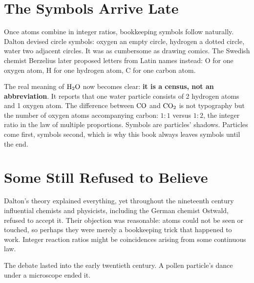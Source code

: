 \section{The Symbols Arrive Late}

Once atoms combine in integer ratios, bookkeeping symbols follow naturally. Dalton devised circle symbols: oxygen an empty circle, hydrogen a dotted circle, water two adjacent circles. It was as cumbersome as drawing comics. The Swedish chemist Berzelius later proposed letters from Latin names instead: O for one oxygen atom, H for one hydrogen atom, C for one carbon atom.

The real meaning of $\mathrm{H_2O}$ now becomes clear: \textbf{it is a census, not an abbreviation}. It reports that one water particle consists of 2 hydrogen atoms and 1 oxygen atom. The difference between $\mathrm{CO}$ and $\mathrm{CO_2}$ is not typography but the number of oxygen atoms accompanying carbon: $1:1$ versus $1:2$, the integer ratio in the law of multiple proportions. Symbols are particles' shadows. Particles come first, symbols second, which is why this book always leaves symbols until the end.

\section{Some Still Refused to Believe}

Dalton's theory explained everything, yet throughout the nineteenth century influential chemists and physicists, including the German chemist Ostwald, refused to accept it. Their objection was reasonable: atoms could not be seen or touched, so perhaps they were merely a bookkeeping trick that happened to work. Integer reaction ratios might be coincidences arising from some continuous law.

The debate lasted into the early twentieth century. A pollen particle's dance under a microscope ended it.

